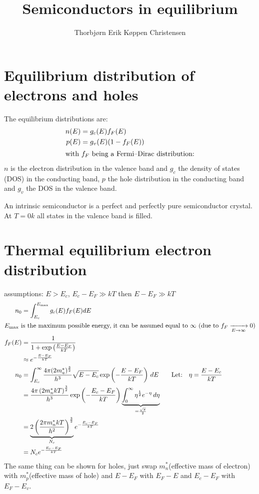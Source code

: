 \documentclass[article,oneside]{memoir}
\title{Semiconductors in equilibrium}
\author{Thorbjørn Erik Køppen Christensen}
\begin{document}
\chapter{Equilibrium distribution of electrons and holes}
The equilibrium distributions are:
\begin{align*}
        n(E)&=g_c(E)f_{F}(E)\\
        p(E)&=g_v(E)(1-f_F(E))\\
        \intertext{with $f_F$ being a Fermi--Dirac distribution:}
\end{align*}
$n$ is the electron distribution in the valence band and $g_c$ the density of states (DOS) in the conducting band, $p$ the hole distribution in the conducting band and $g_v$ the DOS in the valence band.

An intrinsic semiconductor is a perfect and perfectly pure semiconductor crystal. At $T=0k$ all states in the valence band is filled.

\chapter{Thermal equilibrium electron distribution}
assumptions: $E>E_{c}$, $E_c-E_F\gg kT$ then $E-E_F \gg kT$
\begin{align*}
        n_0&=\int_{E_c}^{E_{\textup{max}}}g_c(E)f_F(E)dE\\
        \intertext{$E_{\textup{max}}$ is the maximum possible energy, it can be assumed equal to $\infty$ (due to $f_F\xrightarrow[E\rightarrow\infty]{}0$)}
        f_{F}(E)&=\frac{1}{1+\exp\left( \frac{E-E_{F}}{kT} \right)}\\
        &\approx e^{-\frac{E-E_F}{kT}}\\
        n_0&=\int_{E_c}^{\infty}\frac{4\pi(2m_a^*)^{\frac{3}{2}}}{h^3}\sqrt{E-E_c}\exp\left( -\frac{E-E_F}{kT} \right)\,dE\qquad\textup{Let:}\quad\eta=\frac{E-E_c}{kT}\\
        &=\frac{4\pi\left( 2m_{n}^{*}kT \right)^{\frac{3}{2}}}{h^3}\exp\left( -\frac{E_c-E_F}{kT} \right)\underbrace{\int_0^{\infty}\eta^{\frac{1}{2}}e^{-\eta}\,d\eta }_{=\frac{\sqrt{\pi}}{2}}\\
        &=\underbrace{2\left( \frac{2\pi m_{n}^*kT}{h^2} \right)^{\frac{3}{2}}}_{N_c}e^{-\frac{E_c-E_F}{kT}}\\
        &=N_ce^{-\frac{E_c-E_F}{kT}}
\end{align*}
The same thing can be shown for holes, just swap $m_n^*$(effective mass of electron) with $m_p^*$(effective mass of hole) and $E-E_F$ with $E_F-E$ and $E_c-E_F$ with $E_F-E_v$.
\end{document}
